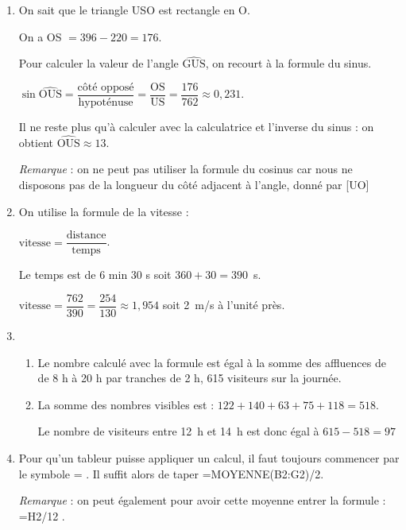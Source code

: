 \documentclass[10pt]{article}
\begin{document}
\begin{enumerate}
\item On sait que le triangle USO est rectangle en O. 

On a OS $ = 396 - 220 = 176$.

Pour calculer la valeur de l'angle $\widehat{\text{GUS}}$, on recourt à
la formule du sinus.

$\sin \widehat{\text{OUS}} = \dfrac{\text{côté opposé}}{\text{hypoténuse}} = \dfrac{\text{OS}}{\text{US}} = \dfrac{176}{762} \approx  0,231$.

Il ne reste plus qu'à calculer avec la calculatrice et l'inverse du sinus : on obtient $\widehat{\text{OUS}} \approx  13$\degres.

\emph{Remarque} : on ne peut pas utiliser la formule du cosinus car nous ne disposons pas de la longueur du côté adjacent à l'angle, donné par [UO]
\item On utilise la formule de la vitesse :

$\text{vitesse} = \dfrac{\text{distance}}{\text{temps}}$.

Le temps est de 6 min 30 s soit $360 + 30 = 390$~s.

$\text{vitesse} = \dfrac{762}{390} = \dfrac{254}{130} \approx 1,954$ soit 2~m/s à l'unité près. 
\item 
	\begin{enumerate}
		\item Le nombre calculé avec la formule est égal à la somme des affluences de de 8 h à 20 h par tranches de 2 h, 615 visiteurs sur la journée.
		\item La somme des nombres visibles est : $122 + 140 + 63 + 75 + 118 = 518$.
		
Le nombre de visiteurs entre 12~h et 14~h est donc égal à $615 - 518 = 97$
	\end{enumerate}
\item Pour qu'un tableur puisse appliquer un calcul, il faut toujours commencer par le symbole \og = \fg. Il suffit alors de taper \og  =MOYENNE(B2:G2)/2\fg.

\emph{Remarque} : on peut également pour avoir cette moyenne entrer la formule : \og =H2/12 \fg.
\end{enumerate}
\end{document}
